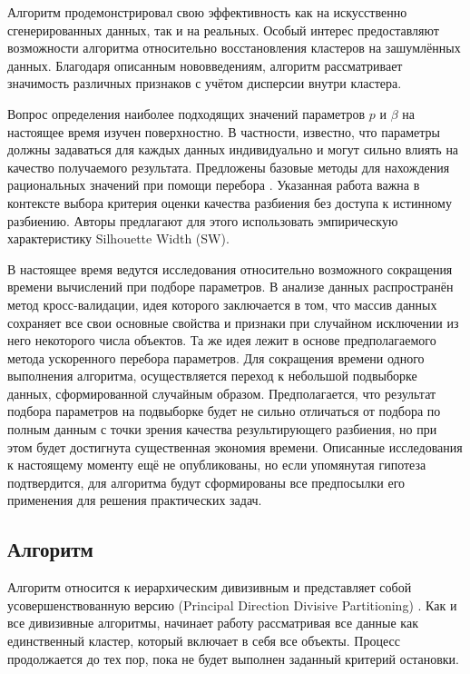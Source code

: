 \documentclass[12pt]{diploma}
\begin{document}
		Алгоритм \AWardpb продемонстрировал свою эффективность как на искусственно сгенерированных данных, так и на реальных. Особый интерес предоставляют возможности алгоритма относительно восстановления кластеров на зашумлённых данных. Благодаря описанным нововведениям, алгоритм рассматривает значимость различных признаков с учётом дисперсии внутри кластера.
		
		Вопрос определения наиболее подходящих значений параметров $ p $ и $ \beta  $ на настоящее время изучен поверхностно. В частности, известно, что параметры должны задаваться для каждых данных индивидуально и могут сильно влиять на качество получаемого результата. Предложены базовые методы для нахождения рациональных значений при помощи перебора \cite{sw-based-search}. Указанная работа важна в контексте выбора критерия оценки качества разбиения без доступа к истинному разбиению. Авторы предлагают для этого использовать эмпирическую характеристику Silhouette Width (SW).
		
		В настоящее время ведутся исследования относительно возможного сокращения времени вычислений при подборе параметров. В анализе данных распространён метод кросс-валидации, идея которого заключается в том, что массив данных сохраняет все свои основные свойства и признаки при случайном исключении из него некоторого числа объектов. Та же идея лежит в основе предполагаемого метода ускоренного перебора параметров. Для сокращения времени одного выполнения алгоритма, осуществляется переход к небольшой подвыборке данных, сформированной случайным образом. Предполагается, что результат подбора параметров на подвыборке будет не сильно отличаться от подбора по полным данным с точки зрения качества результирующего разбиения, но при этом будет достигнута существенная экономия времени. Описанные исследования к настоящему моменту ещё не опубликованы, но если упомянутая гипотеза подтвердится, для алгоритма будут сформированы все предпосылки его применения для решения практических задач.
	
	\subsection{Алгоритм \dePDDP}
	Алгоритм \dePDDP относится к иерархическим дивизивным и представляет собой усовершенствованную версию \PDDP (Principal Direction Divisive Partitioning) \cite{pddp-canonical}. Как и все дивизивные алгоритмы, \dePDDP начинает работу рассматривая все данные как единственный кластер, который включает в себя все объекты. Процесс продолжается до тех пор, пока не будет выполнен заданный критерий остановки.
	
\end{document}
